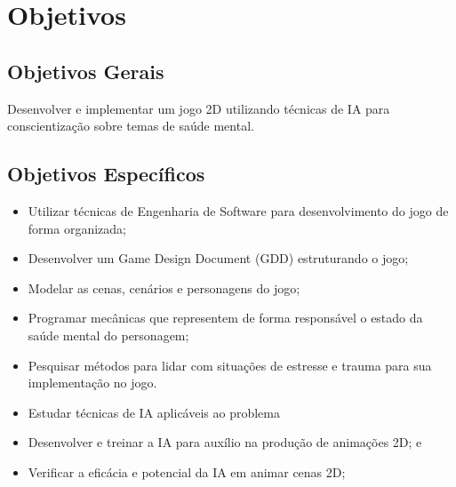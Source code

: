 \chapter{Objetivos}
\label{c.objetivos}

\section{Objetivos Gerais}
\label{s.gerais}

Desenvolver e implementar um jogo 2D utilizando técnicas de IA para conscientização sobre temas de saúde mental. 


\section{Objetivos Específicos}
\label{s.especificos}

\begin{itemize}
\item Utilizar técnicas de Engenharia de Software para desenvolvimento do jogo de forma organizada;
\item Desenvolver um Game Design Document (GDD) estruturando o jogo;
\item Modelar as cenas, cenários e personagens do jogo;
\item Programar mecânicas que representem de forma responsável o estado da saúde mental do personagem;
\item Pesquisar métodos para lidar com situações de estresse e trauma para sua implementação no jogo.
\item Estudar técnicas de IA aplicáveis ao problema
\item Desenvolver e treinar a IA para auxílio na produção de animações 2D; e
\item Verificar a eficácia e potencial da IA em animar cenas 2D;
\end{itemize}